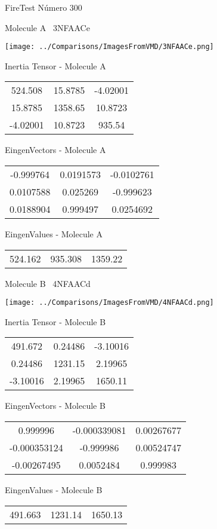 \vtab[-3cm]
\begin{center}
{\large FireTest \tab Número 300}
\end{center}
\begin{multicols}{2}
\begin{center}

Molecule A \
3NFAACe

\texttt{[image: ../Comparisons/ImagesFromVMD/3NFAACe.png]}

Inertia Tensor - Molecule A \\
\begin{tabular}{|c c c|}
524.508	 & 	15.8785	 & 	-4.02001	 \\
15.8785	 & 	1358.65	 & 	10.8723	 \\
-4.02001	 & 	10.8723	 & 	935.54
\end{tabular}

\vtab
 EingenVectors - Molecule A     \\
\begin{tabular}{|c c c|}
-0.999764	 & 	0.0191573	 & 	-0.0102761	 \\
0.0107588	 & 	0.025269	 & 	-0.999623	 \\
0.0188904	 & 	0.999497	 & 	0.0254692
\end{tabular}

\vtab
 EingenValues - Molecule A     \\
\begin{tabular}{|c c c|}
524.162	 & 	935.308	 & 	1359.22	 \\
\end{tabular}
\columnbreak

Molecule B \
4NFAACd

\texttt{[image: ../Comparisons/ImagesFromVMD/4NFAACd.png]}

Inertia Tensor - Molecule B \\
\begin{tabular}{|c c c|}
491.672	 & 	0.24486	 & 	-3.10016	 \\
0.24486	 & 	1231.15	 & 	2.19965	 \\
-3.10016	 & 	2.19965	 & 	1650.11
\end{tabular}

\vtab
 EingenVectors - Molecule B     \\
\begin{tabular}{|c c c|}
0.999996	 & 	-0.000339081	 & 	0.00267677	 \\
-0.000353124	 & 	-0.999986	 & 	0.00524747	 \\
-0.00267495	 & 	0.0052484	 & 	0.999983
\end{tabular}

\vtab
 EingenValues - Molecule B     \\
\begin{tabular}{|c c c|}
491.663	 & 	1231.14	 & 	1650.13	 \\
\end{tabular}

\end{center}
\end{multicols}

